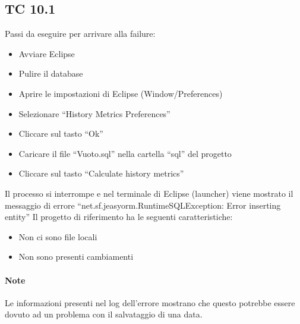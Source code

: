\subsection*{TC 10.1}
Passi da eseguire per arrivare alla failure:
\begin{itemize}
 \item Avviare Eclipse
 \item Pulire il database
 \item Aprire le impostazioni di Eclipse (Window/Preferences)
 \item Selezionare ``History Metrics Preferences''
 \item Cliccare sul tasto ``Ok''
 \item Caricare il file ``Vuoto.sql'' nella cartella ``sql'' del progetto
 \item Cliccare sul tasto ``Calculate history metrics''
\end{itemize}
Il processo si interrompe e nel terminale di Eclipse (launcher) viene mostrato il messaggio di errore ``net.sf.jeasyorm.RuntimeSQLException: Error inserting entity''
\newline
Il progetto di riferimento ha le seguenti caratteristiche:
\begin{itemize}
 \item Non ci sono file locali
 \item Non sono presenti cambiamenti
\end{itemize}

\paragraph{Note} Le informazioni presenti nel log dell'errore mostrano che questo potrebbe essere dovuto ad un problema con il salvataggio di una data.





\newpage





